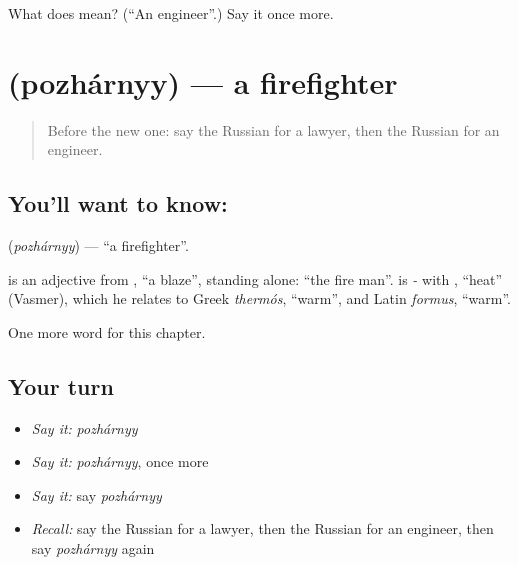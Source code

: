 \begin{tcolorbox}[breakable,colback=teal!4,colframe=teal!35!black,title={Before you move on}]
What does  mean? (\textquotedblleft{}An engineer\textquotedblright{}.) Say it once more.
\end{tcolorbox}
\section[\texorpdfstring{\ru{пожарный} (pozhárnyy)}{пожарный (pozhárnyy)}]{ (pozhárnyy) — a firefighter}

\label{lesson:RU-C109-firefighter}



\begin{quote}
Before the new one: say the Russian for a lawyer, then the Russian for an engineer.
\end{quote}

\subsection*{You'll want to know: }
\textbf{} (\emph{pozhárnyy}) — \textquotedblleft{}a firefighter\textquotedblright{}.

\begin{cousinweb}
\textbf{} is an adjective from \emph{}, \textquotedblleft{}a blaze\textquotedblright{}, standing alone: \textquotedblleft{}the fire man\textquotedblright{}. \emph{} is \emph{-} with \emph{}, \textquotedblleft{}heat\textquotedblright{} (Vasmer), which he relates to Greek \emph{thermós}, \textquotedblleft{}warm\textquotedblright{}, and Latin \emph{formus}, \textquotedblleft{}warm\textquotedblright{}.
\end{cousinweb}

\begin{grammarlens}[title={What you've built}]
One more word for this chapter.
\end{grammarlens}

\subsection*{Your turn}
\begin{itemize}
\raggedright
  \item \emph{Say it:} \emph{pozhárnyy}
  \item \emph{Say it:} \emph{pozhárnyy}, once more
  \item \emph{Say it:} say \emph{pozhárnyy}
  \item \emph{Recall:} say the Russian for a lawyer, then the Russian for an engineer, then say \emph{pozhárnyy} again
\end{itemize}

